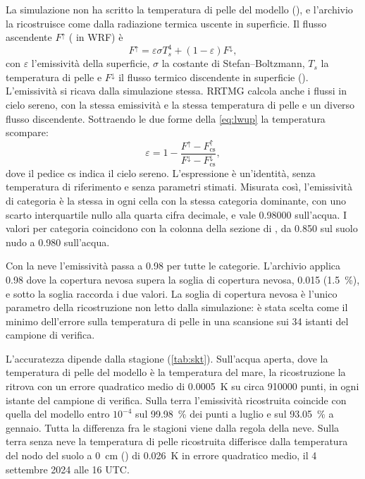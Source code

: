 La simulazione non ha scritto la temperatura di pelle del modello (), e l'archivio la
ricostruisce come  dalla radiazione termica uscente in superficie. Il flusso ascendente
$F^{\uparrow}$ ( in WRF) è
\begin{equation}
  F^{\uparrow} = \varepsilon \sigma T_s^4 + (1 - \varepsilon) F^{\downarrow},
  \label{eq:lwup}
\end{equation}
con $\varepsilon$ l'emissività della superficie, $\sigma$ la costante di Stefan--Boltzmann, $T_s$ la
temperatura di pelle e $F^{\downarrow}$ il flusso termico discendente in superficie (). L'emissività
si ricava dalla simulazione stessa. RRTMG calcola anche i flussi
in cielo sereno, con la stessa emissività e la stessa temperatura di pelle e un diverso flusso
discendente. Sottraendo le due forme della \cref{eq:lwup} la temperatura scompare:
\begin{equation}
  \varepsilon = 1 - \frac{F^{\uparrow} - F^{\uparrow}_\text{cs}}{F^{\downarrow} - F^{\downarrow}_\text{cs}},
  \label{eq:emissivita}
\end{equation}
dove il pedice cs indica il cielo sereno. L'espressione è un'identità, senza temperatura di
riferimento e senza parametri stimati. Misurata così, l'emissività di categoria è la stessa in ogni
cella con la stessa categoria dominante, con uno scarto interquartile nullo alla quarta cifra
decimale, e vale \num{0.98000} sull'acqua. I valori per categoria
coincidono con la colonna  della sezione  di 
\parencite{wrf411}, da \num{0.850} sul suolo nudo a \num{0.980} sull'acqua.

Con la neve l'emissività passa a \num{0.98} per tutte le categorie. L'archivio applica \num{0.98}
dove la copertura nevosa  supera la soglia di copertura nevosa, \num{0.015}
(\SI{1.5}{\percent}), e sotto la soglia raccorda i due valori. La soglia di copertura nevosa è
l'unico parametro della ricostruzione non letto dalla simulazione: è stata scelta come il minimo dell'errore sulla
temperatura di pelle in una scansione sui 34 istanti del campione di verifica.

L'accuratezza dipende dalla stagione (\cref{tab:skt}). Sull'acqua aperta, dove la temperatura di
pelle del modello è la temperatura del mare, la ricostruzione la ritrova con un errore quadratico
medio di \SI{0.0005}{K} su circa \num{910000} punti, in ogni istante del campione di verifica. Sulla terra l'emissività
ricostruita coincide con quella del modello entro $10^{-4}$ sul \SI{99.98}{\percent} dei punti a
luglio e sul \SI{93.05}{\percent} a gennaio. Tutta la differenza fra le stagioni viene dalla regola
della neve. Sulla terra senza neve la temperatura di pelle ricostruita differisce dalla temperatura del nodo
del suolo a \SI{0}{cm} () di \SI{0.026}{K} in errore quadratico medio, il 4 settembre
2024 alle 16 UTC.

